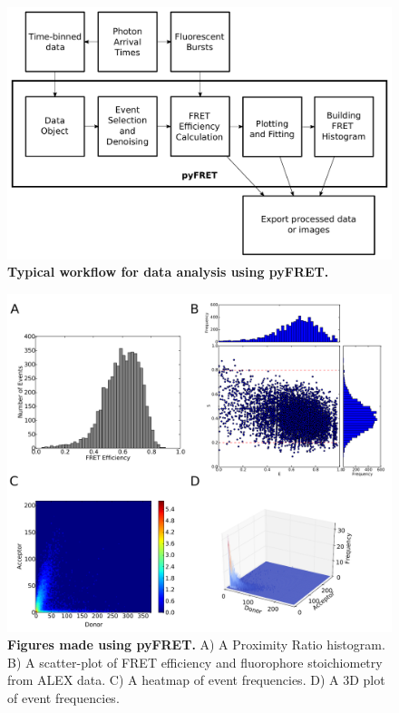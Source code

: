 \begin{figure}[!ht]
   \begin{center}
      \includegraphics*[clip=true, width=6in]{pyFRET/workflow_new.pdf}
      \caption{{\bf Typical workflow for data analysis using pyFRET.}}
      \label{fig:fig2_workflow}
   \end{center}
\end{figure}

\begin{figure}[!ht]
   \begin{center}
      \includegraphics*[clip=true, width=6in]{pyFRET/6bp_example.pdf}
      \caption{{\bf Figures made using pyFRET.} A) A Proximity Ratio histogram. B) A scatter-plot of FRET efficiency and fluorophore stoichiometry from ALEX data. C) A heatmap of event frequencies.  D) A 3D plot of event frequencies.}
      \label{fig:fig3_sample_results}
   \end{center}
\end{figure}

